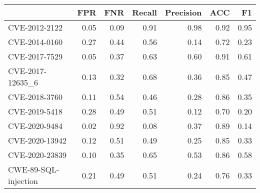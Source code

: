 \begin{tabular}{lrrrrrr}
\toprule
{} &  FPR &  FNR &  Recall &  Precision &  ACC &   F1 \\
\midrule
CVE-2012-2122        & 0.05 & 0.09 &    0.91 &       0.98 & 0.92 & 0.95 \\
CVE-2014-0160        & 0.27 & 0.44 &    0.56 &       0.14 & 0.72 & 0.23 \\
CVE-2017-7529        & 0.05 & 0.37 &    0.63 &       0.60 & 0.91 & 0.61 \\
CVE-2017-12635\_6     & 0.13 & 0.32 &    0.68 &       0.36 & 0.85 & 0.47 \\
CVE-2018-3760        & 0.11 & 0.54 &    0.46 &       0.28 & 0.86 & 0.35 \\
CVE-2019-5418        & 0.28 & 0.49 &    0.51 &       0.12 & 0.70 & 0.20 \\
CVE-2020-9484        & 0.02 & 0.92 &    0.08 &       0.37 & 0.89 & 0.14 \\
CVE-2020-13942       & 0.12 & 0.51 &    0.49 &       0.25 & 0.85 & 0.33 \\
CVE-2020-23839       & 0.10 & 0.35 &    0.65 &       0.53 & 0.86 & 0.58 \\
CWE-89-SQL-injection & 0.21 & 0.49 &    0.51 &       0.24 & 0.76 & 0.33 \\
\bottomrule
\end{tabular}
